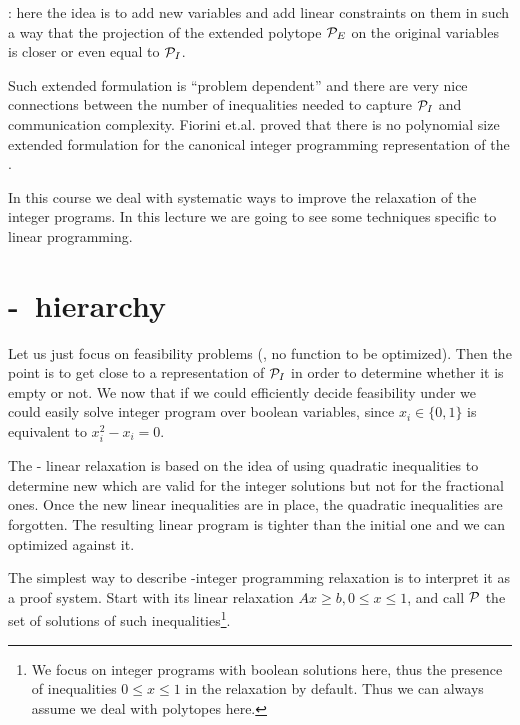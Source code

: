 \documentclass[a4paper,twoside,justified]{tufte-handout}
\begin{document}
: here the idea is to add new
variables and add linear constraints on them in such a way that the
projection of the extended polytope $\mathcal{P}_{E}$ on the original
variables is closer or even equal to $ \mathcal{P}_{I} $.

Such extended formulation is ``problem dependent'' and there are very
nice connections between the number of inequalities needed to capture
$ \mathcal{P}_{I} $ and communication complexity. Fiorini
et.al.\cite{fiorini2012linear} proved that there is no polynomial size
extended formulation for the canonical integer programming
representation of the .

In this course we deal with systematic ways to improve the relaxation
of the integer programs. In this lecture we are going to see some
techniques specific to linear programming.

\section{\Lovasz-\Schrijver\ hierarchy}

Let us just focus on feasibility problems (\ie, no function to be
optimized). Then the point is to get close to a representation of $
\mathcal{P}_{I} $ in order to determine whether it is empty or not. We now
that if we could efficiently decide feasibility under
 we could easily solve integer
program over boolean variables, since $ x_{i}\in\{0,1\} $ is
equivalent to $ x^{2}_{i} - x_{i} =0 $.

The \Lovasz-\Schrijver\cite{lovasz1991cones} linear relaxation is
based on the idea of using quadratic inequalities to determine new
 which are valid for the integer
solutions but not for the fractional ones. Once the new linear
inequalities are in place, the quadratic inequalities are forgotten.
The resulting linear program is tighter than the initial one and we
can optimized against it.

The simplest way to describe \Lovasz-\Schrijver integer programming
relaxation is to interpret it as a proof system. Start with its linear
relaxation $ Ax \geq b, 0 \leq x \leq 1$, and call $ \mathcal{P} $ the set
of solutions of such inequalities\footnote{We focus on integer
  programs with boolean solutions here, thus the presence of
  inequalities $ 0 \leq x \leq 1 $ in the relaxation by
  default. Thus we can always assume we deal with polytopes here.}.
\end{document}
